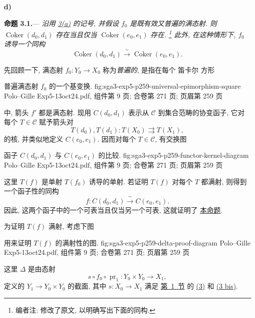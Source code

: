 \medskip
{}\label{par:sga3-V-3-d}%
\noindent\textbf{d)}

\medskip
{}\label{prop:sga3-V-3.1}%
\noindent\textbf{命题 3.1.}---
\textit{沿用 \hyperref[par:sga3-V-3-a]{3(a)} 的记号,
并假设 \(f_0\) 是既有效又普遍的满态射.
则 \(\operatorname{Coker}(d_0,d_1)\) 存在当且仅当
\(\operatorname{Coker}(e_0,e_1)\) 存在.%
\footnote{\label{note:sga3-V-14}编者注: 修改了原文, 以明确写出下面的同构.}
此外, 在这种情形下, \(f_0\) 诱导一个同构}
\label{eq:sga3-V-3.1-cokernel-isomorphism}%
\[
  \operatorname{Coker}(d_0,d_1)
  \xrightarrow{\ \sim\ }
  \operatorname{Coker}(e_0,e_1).
\]

先回顾一下, 满态射 \(f_0:Y_0\to X_0\) 称为\emph{普遍的},
是指在每个 笛卡尔 方形

  {普遍满态射 \(f_0\) 的一个基变换.}
  {fig:sga3-exp5-p259-universal-epimorphism-square}
  {Polo--Gille Exp5-13oct24.pdf, 组件第 9 页; 合卷第 271 页; 页眉第 259 页}

\noindent 中, 箭头 \(f'\) 都是满态射.
现用 \(C(d_0,d_1)\) 表示从 \(\mathscr C\) 到集合范畴的协变函子,
它对每个 \(T\in\mathscr C\) 赋予箭头对
\[
  T(d_0),T(d_1):T(X_0)\rightrightarrows T(X_1),
\]
的核, 并类似地定义 \(C(e_0,e_1)\).
因而对每个 \(T\in\mathscr C\), 有交换图

  {函子 \(C(d_0,d_1)\) 与 \(C(e_0,e_1)\) 的比较.}
  {fig:sga3-exp5-p259-functor-kernel-diagram}
  {Polo--Gille Exp5-13oct24.pdf, 组件第 9 页; 合卷第 271 页; 页眉第 259 页}

这里 \(T(f)\) 是单射 \(T(f_0)\) 诱导的单射.
若证明 \(T(f)\) 对每个 \(T\) 都满射, 则得到一个函子性的同构
\[
  f:C(d_0,d_1)\xrightarrow{\ \sim\ }C(e_0,e_1).
\]
因此, 这两个函子中的一个可表当且仅当另一个可表,
这就证明了 \hyperref[prop:sga3-V-3.1]{本命题}.

为证明 \(T(f)\) 满射, 考虑下图

  {用来证明 \(T(f)\) 的满射性的图.}
  {fig:sga3-exp5-p259-delta-proof-diagram}
  {Polo--Gille Exp5-13oct24.pdf, 组件第 9 页; 合卷第 271 页; 页眉第 259 页}

这里 \(\Delta\) 是由态射
\[
  s\circ f_0\circ\operatorname{pr}_1:Y_0\times Y_0\longrightarrow X_1,
\]
定义的 \(Y_1\to Y_0\times Y_0\) 的截面,
其中 \(s:X_0\to X_1\) 满足 \hyperref[sec:sga3-V-1]{第~1~节} 的
\hyperref[eq:sga3-exp5-3]{(3)} 和
\hyperref[eq:sga3-exp5-3bis]{(3 bis)}.

